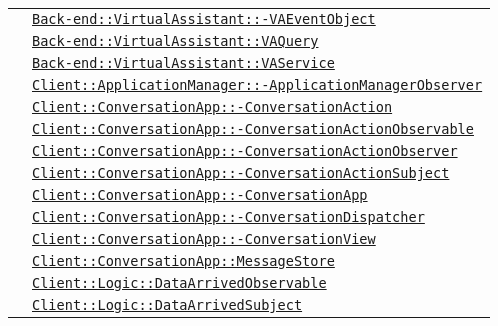 \begin{longtable}{|>{\centering}m{3cm}|m{10cm}<{\centering}|}
& \hyperref[Back-end::VirtualAssistant::VAEventObject]{\texttt{Back-end::VirtualAssistant::-\linebreak VAEventObject}}\\
& \hyperref[Back-end::VirtualAssistant::VAQuery]{\texttt{Back-end::VirtualAssistant::VAQuery}}\\
& \hyperref[Back-end::VirtualAssistant::VAService]{\texttt{Back-end::VirtualAssistant::VAService}}\\
& \hyperref[Client::ApplicationManager::ApplicationManagerObserver]{\texttt{Client::ApplicationManager::-\linebreak ApplicationManagerObserver}}\\
& \hyperref[Client::ConversationApp::ConversationAction]{\texttt{Client::ConversationApp::-\linebreak ConversationAction}}\\
& \hyperref[Client::ConversationApp::ConversationActionObservable]{\texttt{Client::ConversationApp::-\linebreak ConversationActionObservable}}\\
& \hyperref[Client::ConversationApp::ConversationActionObserver]{\texttt{Client::ConversationApp::-\linebreak ConversationActionObserver}}\\
& \hyperref[Client::ConversationApp::ConversationActionSubject]{\texttt{Client::ConversationApp::-\linebreak ConversationActionSubject}}\\
& \hyperref[Client::ConversationApp::ConversationApp]{\texttt{Client::ConversationApp::-\linebreak ConversationApp}}\\
& \hyperref[Client::ConversationApp::ConversationDispatcher]{\texttt{Client::ConversationApp::-\linebreak ConversationDispatcher}}\\
& \hyperref[Client::ConversationApp::ConversationView]{\texttt{Client::ConversationApp::-\linebreak ConversationView}}\\
& \hyperref[Client::ConversationApp::MessageStore]{\texttt{Client::ConversationApp::MessageStore}}\\
& \hyperref[Client::Logic::DataArrivedObservable]{\texttt{Client::Logic::DataArrivedObservable}}\\
& \hyperref[Client::Logic::DataArrivedSubject]{\texttt{Client::Logic::DataArrivedSubject}}\\

\end{longtable}
